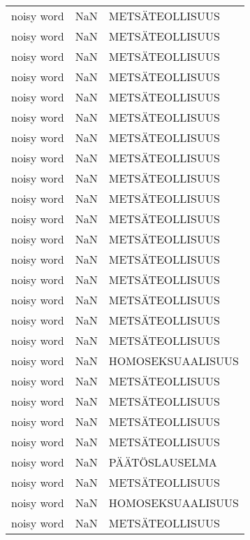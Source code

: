 \begin{tabular}{lll}
 noisy word &  NaN &       METSÄTEOLLISUUS \\
 noisy word &  NaN &       METSÄTEOLLISUUS \\
 noisy word &  NaN &       METSÄTEOLLISUUS \\
 noisy word &  NaN &       METSÄTEOLLISUUS \\
 noisy word &  NaN &       METSÄTEOLLISUUS \\
 noisy word &  NaN &       METSÄTEOLLISUUS \\
 noisy word &  NaN &       METSÄTEOLLISUUS \\
 noisy word &  NaN &       METSÄTEOLLISUUS \\
 noisy word &  NaN &       METSÄTEOLLISUUS \\
 noisy word &  NaN &       METSÄTEOLLISUUS \\
 noisy word &  NaN &       METSÄTEOLLISUUS \\
 noisy word &  NaN &       METSÄTEOLLISUUS \\
 noisy word &  NaN &       METSÄTEOLLISUUS \\
 noisy word &  NaN &       METSÄTEOLLISUUS \\
 noisy word &  NaN &       METSÄTEOLLISUUS \\
 noisy word &  NaN &       METSÄTEOLLISUUS \\
 noisy word &  NaN &       METSÄTEOLLISUUS \\
 noisy word &  NaN &     HOMOSEKSUAALISUUS \\
 noisy word &  NaN &       METSÄTEOLLISUUS \\
 noisy word &  NaN &       METSÄTEOLLISUUS \\
 noisy word &  NaN &       METSÄTEOLLISUUS \\
 noisy word &  NaN &       METSÄTEOLLISUUS \\
 noisy word &  NaN &        PÄÄTÖSLAUSELMA \\
 noisy word &  NaN &       METSÄTEOLLISUUS \\
 noisy word &  NaN &     HOMOSEKSUAALISUUS \\
 noisy word &  NaN &       METSÄTEOLLISUUS \\
\bottomrule
\end{tabular}
